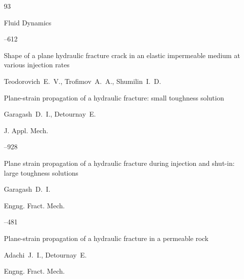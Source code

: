 \begin{thebibliography}{93}










\jour Fluid Dynamics




--612

\paper Shape of a plane hydraulic fracture crack in an elastic impermeable medium at various injection rates

\by  Teodorovich~E.~V.,  Trofimov~A.~A.,  Shumilin~I.~D.





\paper Plane-strain propagation of a hydraulic fracture: small toughness solution

\by   Garagash~D.~I., Detournay~E.

\jour J. Appl. Mech.




–928







\paper Plane strain propagation of a hydraulic fracture during injection and shut-in: large toughness solutions

\by   Garagash~D.~I.

\jour Engng. Fract. Mech. 




–481





\paper Plane-strain propagation of a hydraulic fracture in a permeable rock

\by   Adachi~J.~I., Detournay~E.

\jour Engng. Fract. Mech. 


\end{thebibliography}
